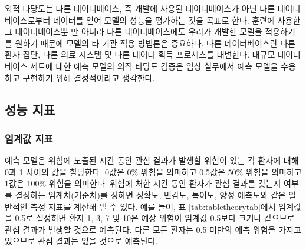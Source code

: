 \documentclass[10.5pt]{book}
\theoremstyle{definition}
\theoremstyle{definition}
\theoremstyle{definition}
\theoremstyle{remark}
\begin{document}
외적 타당도는 다른 데이터베이스, 즉 개발에 사용된 데이터베이스가 아닌
다른 데이터베이스로부터 데이터를 얻어 모델의 성능을 평가하는 것을 목표로
한다. 훈련에 사용한 그 데이터베이스뿐 만 아니라 다른 데이터베이스에도
우리가 개발한 모델을 적용하기를 원하기 때문에 모델의 타 기관 적용
방법론은 중요하다. 다른 데이터베이스란 다른 환자 집단, 다른 의료 시스템
및 다른 데이터 획득 프로세스를 대변한다. 대규모 데이터베이스 세트에 대한
예측 모델의 외적 타당도 검증은 임상 실무에서 예측 모델을 수용하고
구현하기 위해 결정적이라고 생각한다.

\subsection{성능 지표}\label{performance}

\subsubsection*{임계값 지표}\label{-}

예측 모델은 위험에 노출된 시간 동안 관심 결과가 발생할 위험이 있는 각
환자에 대해 0과 1 사이의 값을 할당한다. 0값은 0\% 위험을 의미하고
0.5값은 50\% 위험을 의미하고 1값은 100\% 위험을 의미한다. 위험에 처한
시간 동안 환자가 관심 결과를 갖는지 여부를 결정하는 임계치(기준치)를
정하면 정확도, 민감도, 특이도, 양성 예측도와 같은 일반적인 측정 지표를
계산해 낼 수 있다. 예를 들어, 표 \ref{tab:tabletheorytab}에서 임계값을
0.5로 설정하면 환자 1, 3, 7 및 10은 예상 위험이 임계값 0.5보다 크거나
같으므로 관심 결과가 발생할 것으로 예측된다. 다른 모든 환자는 0.5 미만의
예측 위험을 가지고 있으므로 관심 결과는 없을 것으로 예측된다.
  
 
\end{document}
